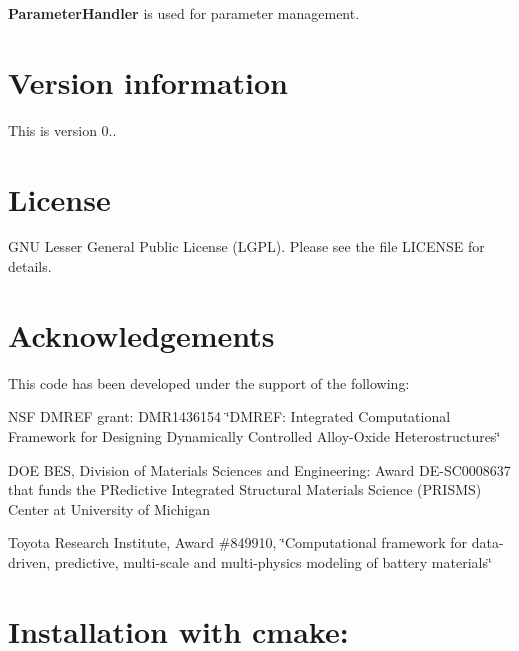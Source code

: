 {\bfseries{Parameter\+Handler}} is used for parameter management.

\section*{{\bfseries{Version information}}~\newline
 }

This is version 0..

\section*{{\bfseries{License}}~\newline
 }

G\+NU Lesser General Public License (L\+G\+PL). Please see the file L\+I\+C\+E\+N\+SE for details.

\section*{{\bfseries{Acknowledgements}}~\newline
 }

This code has been developed under the support of the following\+: ~\newline



\begin{DoxyItemize}
\item N\+SF D\+M\+R\+EF grant\+: D\+M\+R1436154 \char`\"{}\+D\+M\+R\+E\+F\+: Integrated Computational Framework for Designing Dynamically Controlled Alloy-\/\+Oxide Heterostructures\char`\"{} ~\newline

\item D\+OE B\+ES, Division of Materials Sciences and Engineering\+: Award DE-\/S\+C0008637 that funds the P\+Redictive Integrated Structural Materials Science (P\+R\+I\+S\+MS) Center at University of Michigan ~\newline

\item Toyota Research Institute, Award \#849910, \char`\"{}\+Computational framework for data-\/driven, predictive, multi-\/scale and multi-\/physics modeling of battery materials\char`\"{} ~\newline

\end{DoxyItemize}

\section*{{\bfseries{Installation with cmake\+:}}~\newline
 }



